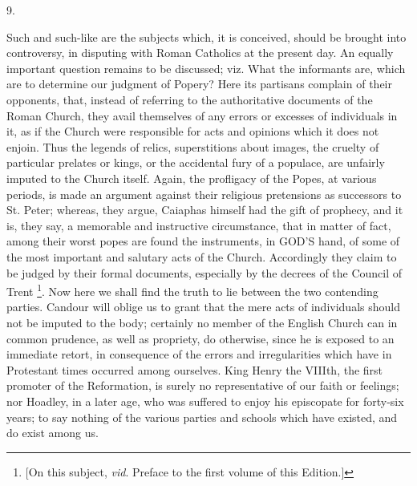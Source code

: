 9.

Such and such-like are the subjects which, it is
conceived, should be brought into controversy, in disputing with Roman
Catholics at the present day. An equally important question remains to
be discussed; viz. What the informants are, which are to determine our
judgment of Popery? Here its partisans complain of their opponents,
that, instead of referring to the authoritative documents of the Roman
Church, they avail themselves of any errors or excesses of individuals
in it, as if the Church were responsible for acts and opinions which
it does not enjoin. Thus the legends of relics, superstitions about
images, the cruelty of particular prelates or kings, or the accidental
fury of a populace, are unfairly imputed to the Church itself. Again,
the profligacy of the Popes, at various periods, is made an argument
against their religious pretensions as successors to St. Peter;
whereas, they argue, Caiaphas himself had the gift of prophecy, and it
is, they say, a memorable and instructive circumstance, that in matter
of fact, among their worst popes are found the instruments, in GOD'S
hand, of some of the most important and salutary acts of the Church.
Accordingly they claim to be judged by their formal documents,
especially by the decrees of the Council of Trent \footnote{[On this subject, \emph{vid}. Preface to the first volume of this
Edition.]}. Now here we shall find the truth to lie between the two
contending parties. Candour will oblige us to grant that the
mere acts of individuals should not be imputed to the body; certainly
no member of the English Church can in common prudence, as well as
propriety, do otherwise, since he is exposed to an immediate retort,
in consequence of the errors and irregularities which have in
Protestant times occurred among ourselves. King Henry the VIIIth, the
first promoter of the Reformation, is surely no representative of our
faith or feelings; nor Hoadley, in a later age, who was suffered to
enjoy his episcopate for forty-six years; to say nothing of the
various parties and schools which have existed, and do exist among us.

